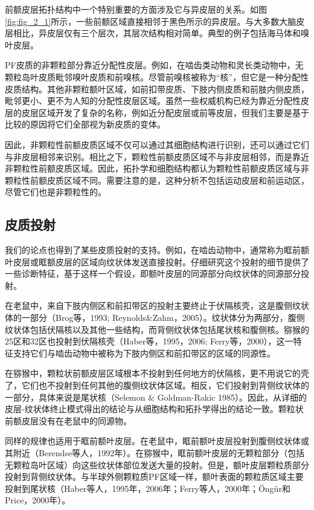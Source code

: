 前额皮层拓扑结构中一个特别重要的方面涉及它与异皮层的关系。如图\ref{fig:fig_2_1}所示，一些前额区域直接相邻于黑色所示的异皮层。与大多数大脑皮层相比，异皮层仅有三个层次，其层次结构相对简单。典型的例子包括海马体和嗅叶皮层。

PF皮质的非颗粒部分靠近分配性皮层。例如，在啮齿类动物和灵长类动物中，无颗粒岛叶皮质毗邻嗅叶皮质和前嗅核。尽管前嗅核被称为“核”，但它是一种分配性皮质结构。其他非颗粒额叶区域，如前扣带皮质、下肢内侧皮质和前肢内侧皮质，毗邻更小、更不为人知的分配性皮层区域。虽然一些权威机构已经为靠近分配性皮层的皮层区域开发了复杂的名称，例如近分配皮层或前等皮层，但我们主要是基于比较的原因将它们全部视为新皮质的变体。

因此，非颗粒性前额皮质区域不仅可以通过其细胞结构进行识别，还可以通过它们与非皮层相邻来识别。相比之下，颗粒性前额皮质区域不与非皮层相邻，而是靠近非颗粒性前额皮质区域。因此，拓扑学和细胞结构都认为颗粒性前额皮质区域与非颗粒性前额皮质区域不同。需要注意的是，这种分析不包括运动皮层和前运动区，尽管它们也是非颗粒性的。

\subsection{皮质投射}
我们的论点也得到了某些皮质投射的支持。例如，在啮齿动物中，通常称为眶前额叶皮层或眶额皮层的区域向纹状体发送直接投射。仔细研究这个投射的细节提供了一些诊断特征，基于这样一个假设，即额叶皮层的同源部分向纹状体的同源部分投射。

在老鼠中，来自下肢内侧区和前扣带区的投射主要终止于伏隔核壳，这是腹侧纹状体的一部分（Brog等，1993; Reynolds\&Zahm，2005）。纹状体分为两部分，腹侧纹状体包括伏隔核以及其他一些结构，而背侧纹状体包括尾状核和腹侧核。猕猴的25区和32区也投射到伏隔核壳（Haber等，1995，2006; Ferry等，2000），这一特征支持它们与啮齿动物中被称为下肢内侧区和前扣带区的区域的同源性。

在猕猴中，颗粒状前额皮层区域根本不投射到任何地方的伏隔核，更不用说它的壳了，它们也不投射到任何其他的腹侧纹状体区域。相反，它们投射到背侧纹状体的一部分，具体来说是尾状核（Selemon \& Goldman-Rakic 1985）。因此，从详细的皮层-纹状体终止模式得出的结论与从细胞结构和拓扑学得出的结论一致。颗粒状前额皮层没有在老鼠中的同源物。

同样的规律也适用于眶前额叶皮层。在老鼠中，眶前额叶皮层投射到腹侧纹状体或其附近（Berendse等人，1992年）。在猕猴中，眶前额叶皮层的无颗粒部分（包括无颗粒岛叶区域）向这些纹状体部位发送大量的投射。但是，额叶皮层颗粒质部分投射到背侧纹状体。与半球外侧颗粒质PF区域一样，额叶表面的颗粒质区域主要投射到尾状核（Haber等人，1995年，2006年；Ferry等人，2000年；Öngür和Price，2000年）。

